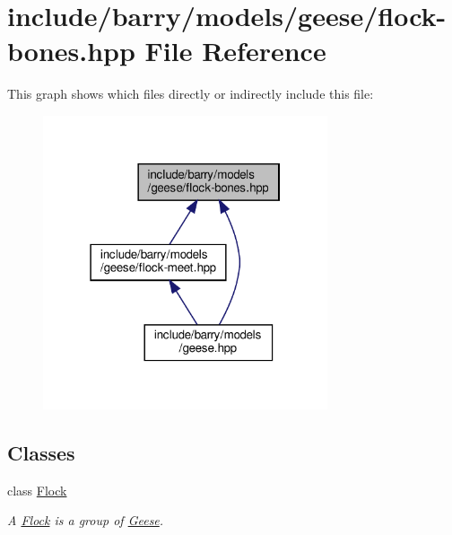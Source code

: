 \hypertarget{flock-bones_8hpp}{}\section{include/barry/models/geese/flock-\/bones.hpp File Reference}
\label{flock-bones_8hpp}
This graph shows which files directly or indirectly include this file\+:\nopagebreak
\begin{figure}[H]
\begin{center}
\leavevmode
\includegraphics[width=238pt]{flock-bones_8hpp__dep__incl}
\end{center}
\end{figure}
\subsection*{Classes}
\begin{DoxyCompactItemize}
\item 
class \hyperlink{class_flock}{Flock}
\begin{DoxyCompactList}\small\item\em A \hyperlink{class_flock}{Flock} is a group of \hyperlink{class_geese}{Geese}. \end{DoxyCompactList}\end{DoxyCompactItemize}
